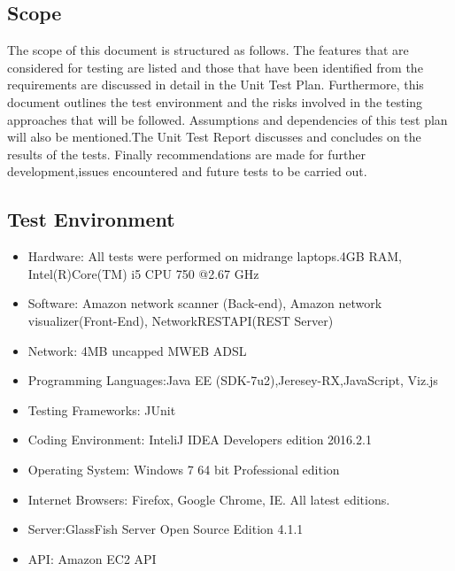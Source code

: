 \documentclass[hidelinks,a4paper,12pt]{article}
\begin{document}
\subsection{Scope}
The scope of this document is structured as follows. The features that are considered for
testing are listed and those that have been identified from the requirements are
discussed in detail in the Unit Test Plan. Furthermore, this document outlines the test environment
and the risks involved in the testing approaches that will be followed. Assumptions and
dependencies of this test plan will also be mentioned.The Unit Test Report
discusses and concludes on the results of the tests. Finally recommendations are made for further development,issues encountered and future tests to be carried out.

\subsection{ Test Environment}



\begin{itemize}
  \item Hardware: All tests were performed on midrange laptops.4GB RAM, Intel(R)Core(TM) i5 CPU 750 @2.67 GHz
\item Software: Amazon network scanner (Back-end), Amazon network visualizer(Front-End), NetworkRESTAPI(REST Server)
\item Network: 4MB uncapped MWEB ADSL
  \item Programming Languages:Java EE (SDK-7u2),Jeresey-RX,JavaScript, Viz.js
  \item Testing Frameworks: JUnit
\item Coding Environment: InteliJ IDEA Developers edition 2016.2.1
\item Operating System: Windows 7 64 bit Professional edition
\item Internet Browsers: Firefox, Google Chrome, IE. All latest editions. 
\item Server:GlassFish Server Open Source Edition 4.1.1 
\item API: Amazon EC2 API 
\end{itemize}
\end{document}
